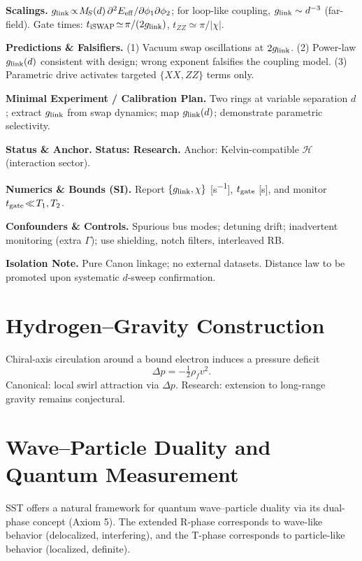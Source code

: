 \documentclass[10pt,reprint,aps,onecolumn,nofootinbib]{revtex4-2}
\newcommand{\rhof}{\rho_{\!f}}                           %
\begin{document}
    \textbf{Scalings.}
    $g_{\rm link}\!\propto\! M_{\!S}(d)\,\partial^2 E_{\rm eff}/\partial\phi_1 \partial\phi_2$; for loop-like coupling, $g_{\rm link}\sim d^{-3}$ (far-field). Gate times: $t_{\rm iSWAP}\!\simeq\!\pi/(2 g_{\rm link})$, $t_{ZZ}\!\simeq\!\pi/|\chi|$.

    \textbf{Predictions \& Falsifiers.}
    (1) Vacuum swap oscillations at $2g_{\rm link}$. (2) Power-law $g_{\rm link}(d)$ consistent with design; wrong exponent falsifies the coupling model. (3) Parametric drive activates targeted $\{XX,ZZ\}$ terms only.

    \textbf{Minimal Experiment / Calibration Plan.}
    Two rings at variable separation $d$; extract $g_{\rm link}$ from swap dynamics; map $g_{\rm link}(d)$; demonstrate parametric selectivity.

    \textbf{Status \& Anchor.}
    \textbf{Status: Research.} Anchor: Kelvin-compatible $\mathcal H$ (interaction sector).

    \textbf{Numerics \& Bounds (SI).}
    Report $\{g_{\rm link},\chi\}$ [\si{s^{-1}}], $t_{\rm gate}$ [\si{s}], and monitor $t_{\rm gate}\!\ll\! T_1,T_2$.

    \textbf{Confounders \& Controls.}
    Spurious bus modes; detuning drift; inadvertent monitoring (extra $\Gamma$); use shielding, notch filters, interleaved RB.

    \textbf{Isolation Note.}
    Pure Canon linkage; no external datasets. Distance law to be promoted upon systematic $d$-sweep confirmation.

    \section{Hydrogen--Gravity Construction}\label{canon58:hydro-grav}
    Chiral-axis circulation around a bound electron induces a pressure deficit
    \[
        \Delta p = -\tfrac12 \rhof v^2.
    \]
    Canonical: local swirl attraction via $\Delta p$. %
    Research: extension to long-range gravity remains conjectural. %


	\section{Wave–Particle Duality and Quantum Measurement}
	SST offers a natural framework for quantum wave–particle duality via its dual-phase concept (Axiom 5). The extended R-phase corresponds to wave-like behavior (delocalized, interfering), and the T-phase corresponds to particle-like behavior (localized, definite).
\end{document}

